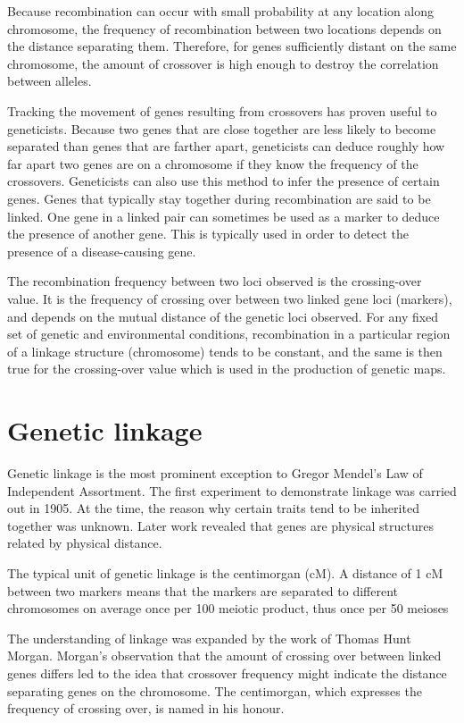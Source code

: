 Because recombination can occur with small probability at any location along chromosome, the frequency of recombination between two locations depends on the distance separating them. Therefore, for genes sufficiently distant on the same chromosome, the amount of crossover is high enough to destroy the correlation between alleles.

Tracking the movement of genes resulting from crossovers has proven useful to geneticists. Because two genes that are close together are less likely to become separated than genes that are farther apart, geneticists can deduce roughly how far apart two genes are on a chromosome if they know the frequency of the crossovers. Geneticists can also use this method to infer the presence of certain genes. Genes that typically stay together during recombination are said to be linked. One gene in a linked pair can sometimes be used as a marker to deduce the presence of another gene. This is typically used in order to detect the presence of a disease-causing gene.

The recombination frequency between two loci observed is the crossing-over value. It is the frequency of crossing over between two linked gene loci (markers), and depends on the mutual distance of the genetic loci observed. For any fixed set of genetic and environmental conditions, recombination in a particular region of a linkage structure (chromosome) tends to be constant, and the same is then true for the crossing-over value which is used in the production of genetic maps.

\hypertarget{genetic-linkage}{%
\section{Genetic linkage}\label{genetic-linkage}}

Genetic linkage is the most prominent exception to Gregor Mendel's Law of Independent Assortment. The first experiment to demonstrate linkage was carried out in 1905. At the time, the reason why certain traits tend to be inherited together was unknown. Later work revealed that genes are physical structures related by physical distance.

The typical unit of genetic linkage is the centimorgan (cM). A distance of 1 cM between two markers means that the markers are separated to different chromosomes on average once per 100 meiotic product, thus once per 50 meioses

The understanding of linkage was expanded by the work of Thomas Hunt Morgan. Morgan's observation that the amount of crossing over between linked genes differs led to the idea that crossover frequency might indicate the distance separating genes on the chromosome. The centimorgan, which expresses the frequency of crossing over, is named in his honour.

